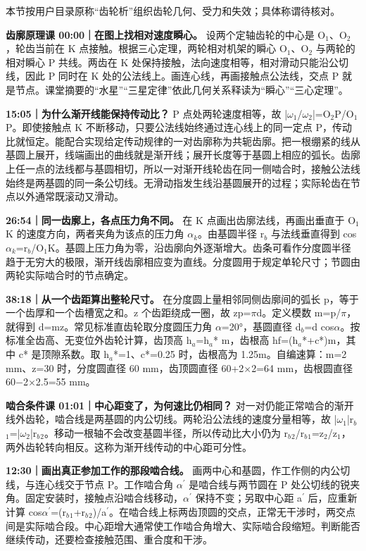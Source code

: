 \documentclass[zihao=5,a4paper,UTF8,fontset=fandol]{ctexart}
\begin{document}
本节按用户目录原称“齿轮析”组织齿轮几何、受力和失效；具体称谓待核对。


\textbf{齿廓原理课 00:00｜在图上找相对速度瞬心。} 设两个定轴齿轮的中心是 O$_{1}$、O$_{2}$，轮齿当前在 K 点接触。根据三心定理，两轮相对机架的瞬心 O$_{1}$、O$_{2}$ 与两轮的相对瞬心 P 共线。两齿在 K 处保持接触，法向速度相等，相对滑动只能沿公切线，因此 P 同时在 K 处的公法线上。画连心线，再画接触点公法线，交点 P 就是节点。课堂摘要的“水星”“三星定律”依此几何关系释读为“瞬心”“三心定理”。


\textbf{15:05｜为什么渐开线能保持传动比？} P 点处两轮速度相等，故 |$\omega$$_{1}$/$\omega$$_{2}$|=O$_{2}$P/O$_{1}$P。即使接触点 K 不断移动，只要公法线始终通过连心线上的同一定点 P，传动比就恒定。能配合实现给定传动规律的一对齿廓称为共轭齿廓。把一根绷紧的线从基圆上展开，线端画出的曲线就是渐开线；展开长度等于基圆上相应的弧长。齿廓上任一点的法线都与基圆相切，所以一对渐开线轮齿在同一侧啮合时，接触公法线始终是两基圆的同一条公切线。无滑动指发生线沿基圆展开的过程；实际轮齿在节点以外通常既滚动又滑动。


\textbf{26:54｜同一齿廓上，各点压力角不同。} 在 K 点画出齿廓法线，再画出垂直于 O$_{1}$K 的速度方向，两者夹角为该点的压力角 $\alpha$$_{k}$。由基圆半径 r$_{b}$ 与法线垂直得到 cos$\alpha$$_{k}$=r$_{b}$/O$_{1}$K。基圆上压力角为零，沿齿廓向外逐渐增大。齿条可看作分度圆半径趋于无穷大的极限，渐开线齿廓相应变为直线。分度圆用于规定单轮尺寸；节圆由两轮实际啮合时的节点确定。


\textbf{38:18｜从一个齿距算出整轮尺寸。} 在分度圆上量相邻同侧齿廓间的弧长 p，等于一个齿厚和一个齿槽宽之和。z 个齿距绕成一圈，故 zp=$\pi$d。定义模数 m=p/$\pi$，就得到 d=mz。常见标准直齿轮取分度圆压力角 $\alpha$=20°，基圆直径 d$_{b}$=d cos$\alpha$。按标准全齿高、无变位外齿轮计算，齿顶高 h$_{a}$=h$_{a}$* m，齿根高 hf=(h$_{a}$*+c*)m，其中 c* 是顶隙系数。取 h$_{a}$*=1、c*=0.25 时，齿根高为 1.25m。自编速算：m=2 mm、z=30 时，分度圆直径 60 mm，齿顶圆直径 60+2$\times$2=64 mm，齿根圆直径 60$-$2$\times$2.5=55 mm。


\textbf{啮合条件课 01:01｜中心距变了，为何速比仍相同？} 对一对仍能正常啮合的渐开线外齿轮，啮合线是两基圆的内公切线。两轮沿公法线的速度分量相等，故 |$\omega$$_{1}$|r$_{b}$$_{1}$=|$\omega$$_{2}$|r$_{b}$$_{2}$。移动一根轴不会改变基圆半径，所以传动比大小仍为 r$_{b}$$_{2}$/r$_{b}$$_{1}$=z$_{2}$/z$_{1}$，两外齿轮转向相反。这称为渐开线传动的中心距可分性。


\textbf{12:30｜画出真正参加工作的那段啮合线。} 画两中心和基圆，作工作侧的内公切线，与连心线交于节点 P。工作啮合角 $\alpha$${}^{\prime}$ 是啮合线与两节圆在 P 处公切线的锐夹角。固定安装时，接触点沿啮合线移动，$\alpha$${}^{\prime}$ 保持不变；另取中心距 a${}^{\prime}$ 后，应重新计算 cos$\alpha$${}^{\prime}$=(r$_{b}$$_{1}$+r$_{b}$$_{2}$)/a${}^{\prime}$。在啮合线上标两齿顶圆的交点，正常无干涉时，两交点间是实际啮合段。中心距增大通常使工作啮合角增大、实际啮合段缩短。判断能否继续传动，还要检查接触范围、重合度和干涉。
\end{document}
